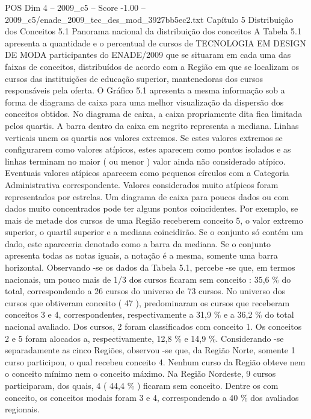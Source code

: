 \begin{textsample}{POS Dim 4 – 2009\_c5 – Score -1.00 – 2009\_c5/enade\_2009\_tec\_des\_mod\_3927bb5ec2.txt}  \label{ex:f4_pos_262}
Capítulo 5 Distribuição dos Conceitos 5.1 Panorama nacional da distribuição dos conceitos A Tabela 5.1 apresenta a quantidade e o percentual de cursos de TECNOLOGIA EM DESIGN DE MODA participantes do ENADE/2009 que se situaram em cada uma das faixas de conceitos, distribuídos de acordo com a Região em que se localizam os cursos das instituições de educação superior, mantenedoras dos cursos responsáveis pela oferta.
O Gráfico 5.1 apresenta a mesma informação sob a forma de diagrama de caixa para uma melhor visualização da dispersão dos conceitos obtidos.
No diagrama de caixa, a caixa propriamente dita fica limitada pelos quartis.
A barra dentro da caixa em negrito representa a mediana.
Linhas verticais unem os quartis aos valores extremos.
Se estes valores extremos se configurarem como valores atípicos, estes aparecem como pontos isolados e as linhas terminam no maior ( ou menor ) valor ainda não considerado atípico.
Eventuais valores atípicos aparecem como pequenos círculos com a Categoria Administrativa correspondente.
Valores considerados muito atípicos foram representados por estrelas.
Um diagrama de caixa para poucos dados ou com dados muito concentrados pode ter alguns pontos coincidentes.
Por exemplo, se mais de metade dos cursos de uma Região receberem conceito 5, o valor extremo superior, o quartil superior e a mediana coincidirão.
Se o conjunto só contém um dado, este apareceria denotado como a barra da mediana.
Se o conjunto apresenta todas as notas iguais, a notação é a mesma, somente uma barra horizontal.
Observando -se os dados da Tabela 5.1, percebe -se que, em termos nacionais, um pouco mais de 1/3 dos cursos ficaram sem conceito : 35,6 \% do total, correspondendo a 26 cursos do universo de 73 cursos.
No universo dos cursos que obtiveram conceito ( 47 ), predominaram os cursos que receberam conceitos 3 e 4, correspondentes, respectivamente a 31,9 \% e a 36,2 \% do total nacional avaliado.
Dos cursos, 2 foram classificados com conceito 1.
Os conceitos 2 e 5 foram alocados a, respectivamente, 12,8 \% e 14,9 \%.
Considerando -se separadamente as cinco Regiões, observou -se que, da Região Norte, somente 1 curso participou, o qual recebeu conceito 4.
Nenhum curso da Região obteve nem o conceito mínimo nem o conceito máximo.
Na Região Nordeste, 9 cursos participaram, dos quais, 4 ( 44,4 \% ) ficaram sem conceito.
Dentre os com conceito, os conceitos modais foram 3 e 4, correspondendo a 40 \% dos avaliados regionais.

\end{textsample}
